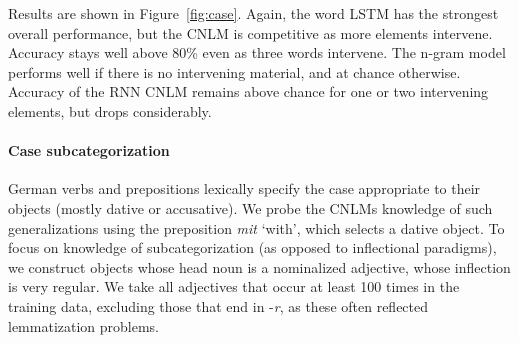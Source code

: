 Results are shown in Figure~\ref{fig:case}.  Again, the word LSTM has
the strongest overall performance, but the CNLM is competitive as more
elements intervene. Accuracy stays well above 80\% even as three
words intervene.  The n-gram model performs well if there is no
intervening material, and at chance otherwise.  Accuracy of the RNN
CNLM remains above chance for one or two intervening elements, but
drops considerably.

%
%

\paragraph{Case subcategorization}
German verbs and prepositions lexically specify the case appropriate
to their objects (mostly dative or accusative).  We probe the CNLMs
knowledge of such generalizations using the preposition \textit{mit}
`with', which selects a dative object. To focus on knowledge of
subcategorization (as opposed to inflectional paradigms), we construct
objects whose head noun is a nominalized adjective, whose inflection
is very regular.  We take all adjectives that occur at least 100 times
in the training data, excluding those that end in -\emph{r}, as these
often reflected lemmatization problems.

